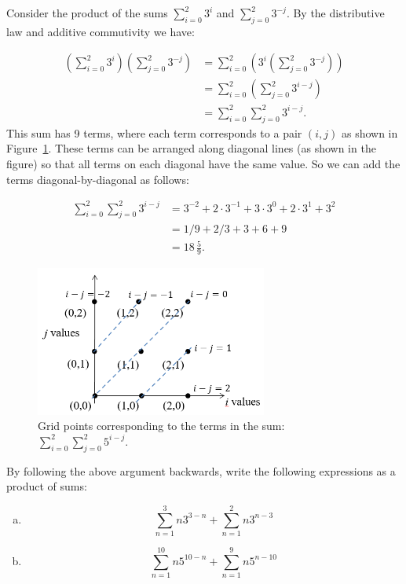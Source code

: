 \begin{example}{}
Consider the product of the sums $\sum_{i=0}^{2} 3^i$ and $\sum_{j=0}^{2}3^{-j}$.
By the distributive law and additive commutivity we have:

\begin{align*}
\left(\sum_{i=0}^{2} 3^i\right) \left( \sum_{j=0}^{2}3^{-j}\right) &= 
\sum_{i=0}^{2} \left(3^i \left( \sum_{j=0}^{2}3^{-j}\right) \right)\\
&= \sum_{i=0}^{2}  \left( \sum_{j=0}^{2}3^{i-j}\right)\\
&= \sum_{i=0}^{2}  \sum_{j=0}^{2}3^{i-j}.
\end{align*}
This sum has 9 terms, where each term corresponds to a pair $(i,j)$ as shown in Figure~\ref{fig:productOfSums}. These terms can be arranged along diagonal lines (as shown in the figure) so that all terms on each diagonal have the same value. So we can add the terms diagonal-by-diagonal as follows:

\begin{align*}
\sum_{i=0}^{2}  \sum_{j=0}^{2}3^{i-j} &= 3^{-2} + 2\cdot 3^{-1}
+3 \cdot 3^0 + 2 \cdot 3^{1} + 3^{2} \\
&= 1/9 + 2/3 + 3 + 6 + 9\\
&= 18\, \frac{5}{9}.
\end{align*}

\begin{figure}[htb]
\begin{center}
	\includegraphics[width=3.0in]{images/productOfSums.png}
\caption{\label{fig:productOfSums} Grid points corresponding to the terms in the sum: $ \sum_{i=0}^{2}  \sum_{j=0}^{2} 5^{i-j} $.}
\end{center}
\end{figure} 
\end{example}

\begin{exercise}{}
By following the above argument backwards, write the following expressions as a product of sums:
\begin{enumerate}[(a)]
\item
\[\sum_{n=1}^3 n3^{3-n} + \sum_{n=1}^2 n3^{n-3}\]
\item
\[\sum_{n=1}^{10} n5^{10-n} + \sum_{n=1}^{9} n5^{n-10}\]
\end{enumerate}
\end{exercise}


